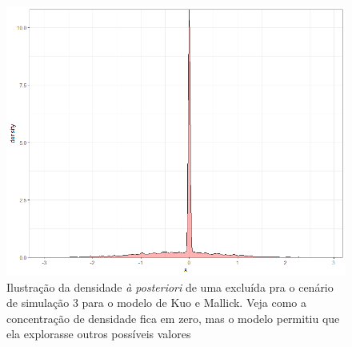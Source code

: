 \begin{figure}
    \centering
    \includegraphics[width = 0.8\linewidth]{images/spike_n_slab2.png}
    \caption{Ilustração da densidade \textit{à posteriori} de uma excluída pra o cenário de simulação 3 para o modelo de Kuo e Mallick. Veja como a concentração de densidade fica em zero, mas o modelo permitiu que ela explorasse outros possíveis valores}
    \label{fig:my_label}
\end{figure}



